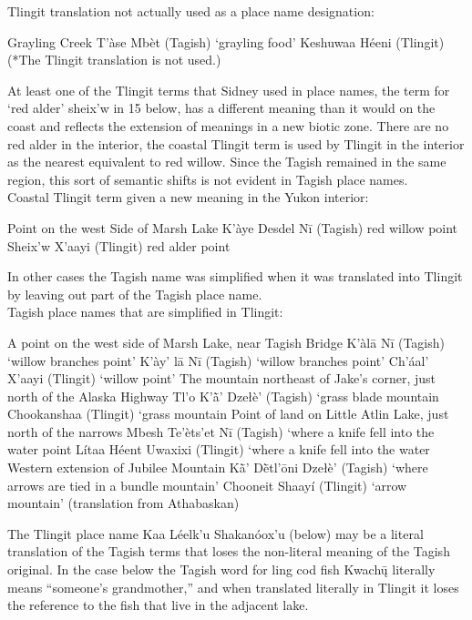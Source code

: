 Tlingit translation not actually used as a place name designation:
\begin{exe}
	 	Grayling Creek
	\sn T’àse Mbèt (Tagish)		`grayling food'
	\sn *Keshuwaa Héeni (Tlingit)	(*The Tlingit translation is not used.)
\end{exe}

At least one of the Tlingit terms that Sidney used in place names, the term for ‘red alder’ sheix’w in 15 below, has a different meaning than it would on the coast and reflects the extension of meanings in a new biotic zone. There are no red alder in the interior, the coastal Tlingit term is used by Tlingit in the interior as the nearest equivalent to red willow. Since the Tagish remained in the same region, this sort of semantic shifts is not evident in Tagish place names.\\

Coastal Tlingit term given a new meaning in the Yukon interior:
\begin{exe}
 Point on the west Side of Marsh Lake
	\sn K’àye Desdel Nī (Tagish)	red willow point
\sn Sheix’w X’aayi (Tlingit)	red alder point
\end{exe}
\noindent
In other cases the Tagish name was simplified when it was translated into Tlingit by leaving out part of the Tagish place name.\\

Tagish place names that are simplified in Tlingit:
\begin{exe}
 A point on the west side of Marsh Lake, near Tagish Bridge
	\sn K’àlā Nī (Tagish)		`willow branches point'
	\sn K’ày’ lā Nī (Tagish)		`willow branches point'
	\sn Ch’áal’ X’aayi (Tlingit)		`willow point'
  The mountain northeast of Jake’s corner, just north of the Alaska Highway
	\sn Tl’o K’ā̀’ Dzełè’	(Tagish)	`grass blade mountain
	\sn Chookanshaa (Tlingit)		`grass mountain
 Point of land on Little Atlin Lake, just north of the narrows
	\sn Mbesh Te’èts’et Nī (Tagish)	`where a knife fell into the water point
	\sn Lítaa Héent Uwaxixi (Tlingit)	`where a knife fell into the water
 Western extension of Jubilee Mountain
	\sn Kā̀’ Dḕtl’ōni Dzełè’ (Tagish)	`where arrows are tied in a bundle mountain'
	\sn Chooneit Shaayí  (Tlingit)	`arrow mountain' (translation from Athabaskan)
\end{exe}

The Tlingit place name Kaa  Léelk’u Shakanóox’u (below) may be a literal translation of the Tagish terms that loses the non-literal meaning of the Tagish original. In the case below the Tagish word for ling cod fish Kwachų̄ literally means “someone’s grandmother,” and when translated literally in Tlingit it loses the reference to the fish that live in the adjacent lake.\\

